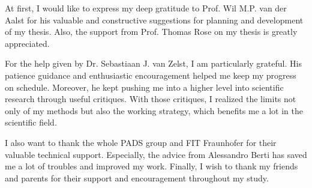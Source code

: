 At first, I would like to express my deep gratitude to Prof. Wil M.P. van der Aalst for his valuable and constructive suggestions for planning and development of my thesis. Also, the support from Prof. Thomas Rose on my thesis is greatly appreciated.


For the help given by Dr. Sebastiaan J. van Zelst, I am particularly grateful. His patience guidance and enthusiastic encouragement helped me keep my progress on schedule. Moreover, he kept pushing me into a higher level into scientific research through useful critiques. With those critiques, I realized the limits not only of my methods but also the working strategy, which benefits me a lot in the scientific field.  

I also want to thank the whole PADS group and FIT Fraunhofer for their valuable technical support. Especially, the advice from Alessandro Berti has saved me a lot of troubles and improved my work. 
Finally, I wish to thank my friends and parents for their support and encouragement throughout my study.